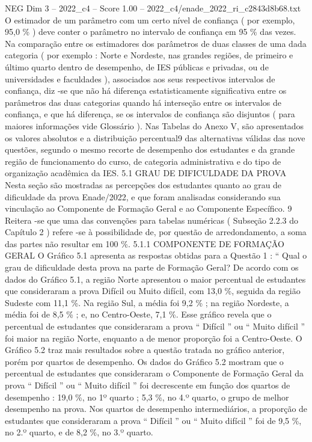 \begin{textsample}{NEG Dim 3 – 2022\_c4 – Score 1.00 – 2022\_c4/enade\_2022\_ri\_c2843d8b68.txt}
O estimador de um parâmetro com um certo nível de confiança ( por exemplo, 95,0 \% ) deve conter o parâmetro no intervalo de confiança em 95 \% das vezes.
Na comparação entre os estimadores dos parâmetros de duas classes de uma dada categoria ( por exemplo : Norte e Nordeste, nas grandes regiões, de primeiro e último quarto dentro de desempenho, de IES públicas e privadas, ou de universidades e faculdades ), associados aos seus respectivos intervalos de confiança, diz -se que não há diferença estatisticamente significativa entre os parâmetros das duas categorias quando há interseção entre os intervalos de confiança, e que há diferença, se os intervalos de confiança são disjuntos ( para maiores informações vide Glossário ).
Nas Tabelas do Anexo V, são apresentados os valores absolutos e a distribuição percentual9 das alternativas válidas das nove questões, segundo o mesmo recorte de desempenho dos estudantes e da grande região de funcionamento do curso, de categoria administrativa e do tipo de organização acadêmica da IES. 5.1 GRAU DE DIFICULDADE DA PROVA Nesta seção são mostradas as percepções dos estudantes quanto ao grau de dificuldade da prova Enade/2022, e que foram analisadas considerando sua vinculação ao Componente de Formação Geral e ao Componente Específico. 9 Reitera -se que uma das convenções para tabelas numéricas ( Subseção 2.2.3 do Capítulo 2 ) refere -se à possibilidade de, por questão de arredondamento, a soma das partes não resultar em 100 \%. 5.1.1 COMPONENTE DE FORMAÇÃO GERAL O Gráfico 5.1 apresenta as respostas obtidas para a Questão 1 : “ Qual o grau de dificuldade desta prova na parte de Formação Geral?
De acordo com os dados do Gráfico 5.1, a região Norte apresentou o maior percentual de estudantes que consideraram a prova Difícil ou Muito difícil, com 13,0 \%, seguida da região Sudeste com 11,1 \%.
Na região Sul, a média foi 9,2 \% ; na região Nordeste, a média foi de 8,5 \% ; e, no Centro-Oeste, 7,1 \%.
Esse gráfico revela que o percentual de estudantes que consideraram a prova “ Difícil ” ou “ Muito difícil ” foi maior na região Norte, enquanto a de menor proporção foi a Centro-Oeste.
O Gráfico 5.2 traz mais resultados sobre a questão tratada no gráfico anterior, porém por quartos de desempenho.
Os dados do Gráfico 5.2 mostram que o percentual de estudantes que consideraram o Componente de Formação Geral da prova “ Difícil ” ou “ Muito difícil ” foi decrescente em função dos quartos de desempenho : 19,0 \%, no 1º quarto ; 5,3 \%, no 4.º quarto, o grupo de melhor desempenho na prova.
Nos quartos de desempenho intermediários, a proporção de estudantes que consideraram a prova “ Difícil ” ou “ Muito difícil ” foi de 9,5 \%, no 2.º quarto, e de 8,2 \%, no 3.º quarto.

\end{textsample}
